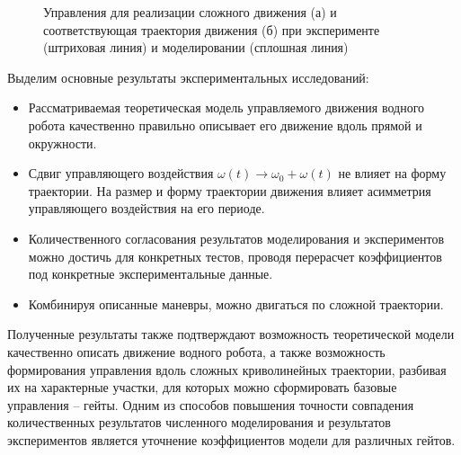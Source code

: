 \begin{figure}[!ht]
	\begin{minipage}[h]{0.5\linewidth}
	\end{minipage}
	\hfill
	\begin{minipage}[h]{0.5\linewidth}
	\end{minipage}
	\caption{Управления для реализации сложного движения (а) и соответствующая траектория движения (б)  при эксперименте (штриховая линия) и моделировании (сплошная линия)}
	\label{Slalom}
\end{figure}

Выделим основные результаты экспериментальных исследований:

\begin{itemize}
	\item Рассматриваемая теоретическая модель управляемого движения водного робота качественно правильно  описывает его движение вдоль прямой и окружности. %
	
	\item Сдвиг управляющего воздействия $\omega(t) \rightarrow \omega_0 + \omega(t)$ не влияет на форму траектории. На размер и форму траектории движения влияет асимметрия управляющего воздействия на его периоде.
	
	\item Количественного согласования результатов моделирования и экспериментов можно достичь для конкретных тестов, проводя перерасчет коэффициентов под конкретные экспериментальные данные.
	
	\item Комбинируя описанные маневры, можно двигаться по сложной траектории.
	
	
\end{itemize}



Полученные результаты также подтверждают возможность теоретической модели качественно описать движение водного робота, а также возможность формирования управления вдоль сложных криволинейных траектории, разбивая их на характерные участки, для которых можно сформировать базовые управления -- гейты. Одним из способов повышения точности совпадения количественных результатов численного моделирования и результатов экспериментов является уточнение коэффициентов модели для различных гейтов.

